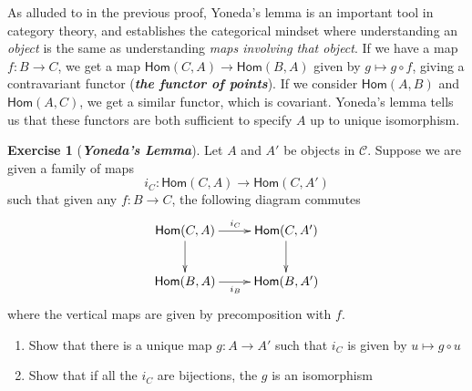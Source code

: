 \documentclass[psamsfonts]{amsart}
\theoremstyle{definition}
\newtheorem{exer}[thm]{Exercise}
\theoremstyle{remark}
\renewcommand{\hom}{\mathsf{Hom}}
\newcommand{\ib}[1]{\textbf{\textit{#1}}}
\begin{document}
As alluded to in the previous proof, Yoneda's lemma is an important tool in category theory, and establishes the categorical mindset where understanding an \emph{object} is the same as understanding \emph{maps involving that object}. If we have a map $f: B \to C$, we get a map $\hom(C,A) \to \hom(B,A)$ given by $g \mapsto g \circ f$, giving a contravariant functor (\ib{the functor of points}). If we consider $\hom(A,B)$ and $\hom(A,C)$, we get a similar functor, which is covariant. Yoneda's lemma tells us that these functors are both sufficient to specify $A$ up to unique isomorphism.
%
\begin{exer}[\ib{Yoneda's Lemma}]
Let $A$ and $A'$ be objects in $\mathscr{C}$. Suppose we are given a family of maps
$$i_C : \hom(C,A) \to \hom(C,A') $$
such that given any $f: B \to C$, the following diagram commutes
$$\xymatrix{
\hom(C,A) \ar[r]^{i_C} \ar[d]  & \hom(C,A') \ar[d] \\
\hom(B,A) \ar[r]_{i_B} & \hom(B,A')
}$$
where the vertical maps are given by precomposition with $f$.
\begin{enumerate}
\item Show that there is a unique map $g: A \to A'$ such that $i_C$ is given by $u \mapsto g \circ u$
\item Show that if all the $i_C$ are bijections, the $g$ is an isomorphism
\end{enumerate}
\end{exer}
%
\end{document}
